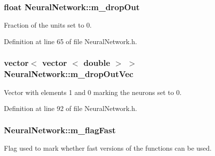 \subsubsection[{\texorpdfstring{m\+\_\+drop\+Out}{m_dropOut}}]{\setlength{\rightskip}{0pt plus 5cm}float Neural\+Network\+::m\+\_\+drop\+Out\hspace{0.3cm}{\ttfamily [protected]}}\hypertarget{classNeuralNetwork_a754d963a6f58aee1e253f64d266ab487}{}\label{classNeuralNetwork_a754d963a6f58aee1e253f64d266ab487}


Fraction of the units set to 0. 



Definition at line 65 of file Neural\+Network.\+h.

\subsubsection[{\texorpdfstring{m\+\_\+drop\+Out\+Vec}{m_dropOutVec}}]{\setlength{\rightskip}{0pt plus 5cm}vector$<$ vector $<$ double $>$ $>$ Neural\+Network\+::m\+\_\+drop\+Out\+Vec\hspace{0.3cm}{\ttfamily [protected]}}\hypertarget{classNeuralNetwork_a456d6c273c0bd4f160f4d20f8b26f37b}{}\label{classNeuralNetwork_a456d6c273c0bd4f160f4d20f8b26f37b}


Vector with elements 1 and 0 marking the neurons set to 0. 



Definition at line 92 of file Neural\+Network.\+h.

\subsubsection[{\texorpdfstring{m\+\_\+flag\+Fast}{m_flagFast}}]{ Neural\+Network\+::m\+\_\+flag\+Fast\hspace{0.3cm}{\ttfamily [protected]}}\hypertarget{classNeuralNetwork_af7766960680b9a413ee4b36acad1e83d}{}\label{classNeuralNetwork_af7766960680b9a413ee4b36acad1e83d}


Flag used to mark whether fast versions of the functions can be used. 



